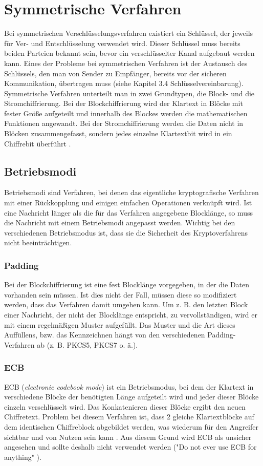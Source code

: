 \documentclass[10pt, a4paper,headsepline]{scrreprt}
\begin{document}
\section{Symmetrische Verfahren}
Bei symmetrischen Verschlüsselungsverfahren existiert ein Schlüssel, der jeweils für Ver- und Entschlüsselung verwendet wird. Dieser Schlüssel muss bereits beiden Parteien bekannt sein, bevor ein verschlüsselter Kanal aufgebaut werden kann. Eines der Probleme bei symmetrischen Verfahren ist der Austausch des Schlüssels, den man von Sender zu Empfänger, bereits vor der sicheren Kommunikation, übertragen muss (siehe Kapitel 3.4  Schlüsselvereinbarung). Symmetrische Verfahren unterteilt man in zwei Grundtypen, die Block- und die Stromchiffrierung. Bei der Blockchiffrierung wird der Klartext in Blöcke mit fester Größe aufgeteilt und innerhalb des Blockes werden die mathematischen Funktionen angewandt. Bei der Stromchiffrierung werden die Daten nicht in Blöcken zusammengefasst, sondern jedes einzelne Klartextbit wird in ein Chiffrebit überführt \citep[S. 223]{book:angewandte-krypto}.

\subsection{Betriebsmodi}
Betriebsmodi sind Verfahren, bei denen das eigentliche kryptografische Verfahren mit einer Rückkopplung und einigen einfachen Operationen verknüpft wird. Ist eine Nachricht länger als die für das Verfahren angegebene Blocklänge, so muss die Nachricht mit einem Betriebsmodi angepasst werden. Wichtig bei den verschiedenen Betriebsmodus ist, dass sie die Sicherheit des Kryptoverfahrens nicht beeinträchtigen.

\subsubsection{Padding}
Bei der Blockchiffrierung ist eine fest Blocklänge vorgegeben, in der die Daten vorhanden sein müssen. Ist dies nicht der Fall, müssen diese so modifiziert werden, dass das Verfahren damit umgehen kann.
Um z. B. den letzten Block einer Nachricht, der nicht der Blocklänge entspricht, zu vervollständigen, wird er mit einem regelmäßigen Muster aufgefüllt. Das Muster und die Art dieses Auffüllens, bzw. das Kennzeichnen hängt von den verschiedenen Padding-Verfahren ab (z. B. PKCS5, PKCS7 o. ä.).

\subsubsection{ECB}
ECB (\textit{electronic codebook mode}) ist ein Betriebsmodus, bei dem der Klartext in verschiedene Blöcke der benötigten Länge aufgeteilt wird und jeder dieser Blöcke einzeln verschlüsselt wird. Das Konkatenieren dieser Blöcke ergibt den neuen Chiffretext. Problem bei diesem Verfahren ist, dass 2 gleiche Klartextblöcke auf dem identischen Chiffreblock abgebildet werden, was wiederum für den Angreifer sichtbar und von Nutzen sein kann \citep[S. 223ff]{book:angewandte-krypto}. Aus diesem Grund wird ECB als unsicher angesehen und sollte deshalb nicht verwendet werden ("Do not ever use ECB for anything" \citep[S. 69]{book:practical-crypto}).
\end{document}
